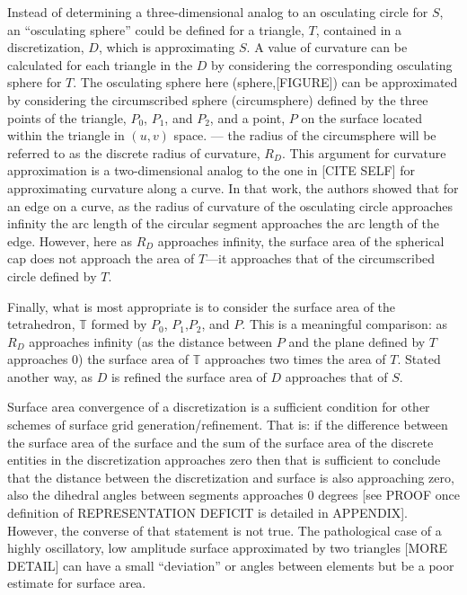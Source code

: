 Instead of determining a three-dimensional analog to an osculating
circle for $S$, an ``osculating sphere'' could be defined for a
triangle, $T$, contained in a discretization, $D$, which is
approximating $S$. A value of curvature can be calculated for each
triangle in the $D$ by considering the corresponding osculating sphere
for $T$. The osculating sphere here (sphere,[FIGURE]) can be
approximated by considering the circumscribed sphere (circumsphere)
\cite{casey1888} defined by the three points of the triangle, $P_0$,
$P_1$, and $P_2$, and a point, $P$ on the surface located within the
triangle in $(u,v)$ space. --- the radius of the circumsphere will be
referred to as the discrete radius of curvature, $R_D$. This argument
for curvature approximation is a two-dimensional analog to the one in
[CITE SELF] for approximating curvature along a curve. In that work, the
authors showed that for an edge on a curve, as the radius of curvature
of the osculating circle approaches infinity the arc length of the
circular segment approaches the arc length of the edge. However, here as
$R_D$ approaches infinity, the surface area of the spherical cap does
not approach the area of $T$---it approaches that of the circumscribed
circle defined by $T$.

Finally, what is most appropriate is to consider the surface area of the
tetrahedron, ${\mathbb T}$ formed by $P_0$, $P_1$,$P_2$, and $P$. This is a meaningful
comparison: as $R_D$ approaches infinity (as the distance between $P$
and the plane defined by $T$ approaches $0$) the surface area of
${\mathbb T}$ approaches two times the area of $T$. Stated another way,
  as $D$ is refined the surface area of $D$ approaches that of $S$.

Surface area convergence of a discretization is a sufficient condition
for other schemes of surface grid generation/refinement. That is: if the
difference between the surface area of the surface and the sum of the
surface area of the discrete entities in the discretization approaches
zero then that is sufficient to conclude that the distance between the
discretization and surface is also approaching zero, also the dihedral
angles between segments approaches $0$ degrees [see PROOF once
definition of REPRESENTATION DEFICIT is detailed in APPENDIX]. However,
the converse of that statement is not true. The pathological case of a
highly oscillatory, low amplitude surface approximated by two triangles
[MORE DETAIL] can have a small ``deviation'' or angles between elements
but be a poor estimate for surface area.
